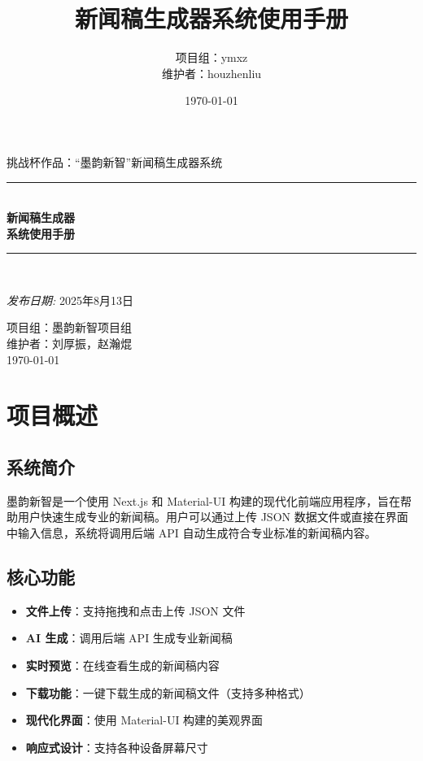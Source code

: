 \documentclass[a4paper, 12pt]{article}
\title{\LARGE{\textbf{新闻稿生成器系统使用手册}}}
\author{项目组：ymxz \\ 维护者：houzhenliu}
\date{\today}
\begin{document}
\begin{titlepage}
    \centering
    \vspace*{1cm}
    \textsc{\LARGE 挑战杯作品：“墨韵新智”新闻稿生成器系统}\\[0.5cm]
    \rule{\linewidth}{0.5mm} \\[0.4cm]
    { \huge \bfseries 新闻稿生成器\\系统使用手册 \\[0.4cm] }
    \rule{\linewidth}{0.5mm} \\[1.5cm]
    
    \begin{minipage}{0.5\textwidth}
        \begin{center}
            \large
            \emph{发布日期:} 2025年8月13日
        \end{center}
    \end{minipage}
    
    \vfill
    
    {\large 项目组：墨韵新智项目组\\
    维护者：刘厚振，赵瀚焜\\
    \today}
    
\end{titlepage}

\tableofcontents
\newpage

\section{项目概述}

\subsection{系统简介}
墨韵新智是一个使用 Next.js 和 Material-UI 构建的现代化前端应用程序，旨在帮助用户快速生成专业的新闻稿。用户可以通过上传 JSON 数据文件或直接在界面中输入信息，系统将调用后端 API 自动生成符合专业标准的新闻稿内容。

\subsection{核心功能}
\begin{itemize}
    \item \textbf{文件上传}：支持拖拽和点击上传 JSON 文件
    \item \textbf{AI 生成}：调用后端 API 生成专业新闻稿
    \item \textbf{实时预览}：在线查看生成的新闻稿内容
    \item \textbf{下载功能}：一键下载生成的新闻稿文件（支持多种格式）
    \item \textbf{现代化界面}：使用 Material-UI 构建的美观界面
    \item \textbf{响应式设计}：支持各种设备屏幕尺寸
\end{itemize}
\end{document}
